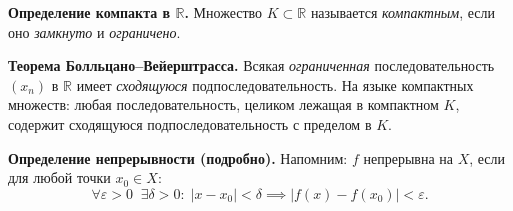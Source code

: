 
\textbf{Определение компакта в $\mathbb{R}$.}
Множество $K\subset\mathbb{R}$ называется \emph{компактным}, если оно \emph{замкнуто} и \emph{ограничено}.

\medskip

\textbf{Теорема Болльцано--Вейерштрасса.}
Всякая \emph{ограниченная} последовательность $(x_n)$ в $\mathbb{R}$ имеет \emph{сходящуюся} подпоследовательность.  
На языке компактных множеств: любая последовательность, целиком лежащая в компактном $K$, содержит сходящуюся подпоследовательность с пределом в $K$.

\medskip

\textbf{Определение непрерывности (подробно).}
Напомним: $f$ непрерывна на $X$, если для любой точки $x_0\in X$:
\[
\forall \varepsilon>0\;\;\exists \delta>0:\;
|x - x_0|<\delta \implies |f(x)-f(x_0)|<\varepsilon.
\]

\medskip

